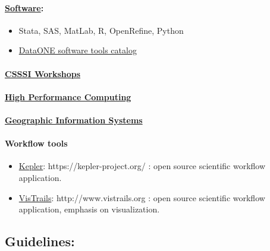 \documentclass[]{article}
\begin{document}
\paragraph{\href{http://csssi.yale.edu/tech}{Software}:}\label{software}

\begin{itemize}
\itemsep1pt\parskip0pt
\item
  Stata, SAS, MatLab, R, OpenRefine, Python
\item
  \href{http://www.dataone.org/software_tools_catalog}{DataONE software
  tools catalog}
\end{itemize}

\paragraph{\href{http://statlab.stat.yale.edu/workshops/}{CSSSI
Workshops}}\label{csssi-workshops}

\paragraph{\href{http://its.yale.edu/services/research-technologies/high-performance-computing}{High
Performance Computing}}\label{high-performance-computing}

\paragraph{\href{http://guides.library.yale.edu/gis}{Geographic
Information Systems}}\label{geographic-information-systems}

\paragraph{Workflow tools}\label{workflow-tools}

\begin{itemize}
\itemsep1pt\parskip0pt
\item
  \href{https://kepler-project.org/}{Kepler}:
  https://kepler-project.org/ : open source scientific workflow
  application.
\item
  \href{http://www.vistrails.org/index.php/Main_Page}{VisTrails}:
  http://www.vistrails.org : open source scientific workflow
  application, emphasis on visualization.
\end{itemize}

\subsection{Guidelines:}\label{guidelines-1}
\end{document}
